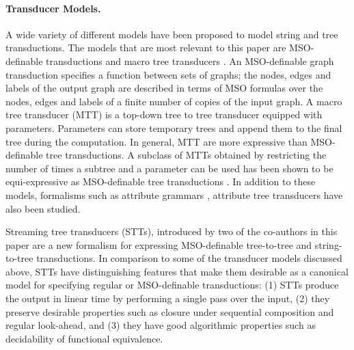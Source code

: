 \documentclass[11pt]{article}
\begin{document}
\paragraph{Transducer Models.}
A wide variety of different models have been proposed to model string
and tree transductions. The models that are most relevant to this
paper are MSO-definable transductions
\cite{courcelle_graph_2002,engelfriet_mso_2001} and macro tree
transducers \cite{engelfriet_macro_1985,engelfriet_macro2_1999}. An
MSO-definable graph transduction specifies a function between sets of
graphs; the nodes, edges and labels of the output graph are described
in terms of MSO formulas over the nodes, edges and labels of a finite
number of copies of the input graph.  A macro tree transducer (MTT) is
a top-down tree to tree transducer equipped with parameters.
Parameters can store temporary trees and append them to the final tree
during the computation. In general, MTT are more expressive than
MSO-definable tree transductions. A subclass of MTTs obtained by
restricting the number of times a subtree and a parameter can be used
has been shown to be equi-expressive as MSO-definable tree
transductions \cite{engelfriet_macro2_1999}. In addition to these
models, formalisms such as attribute grammars
\cite{engelfriet_macro2_1999}, attribute tree transducers
\cite{bloem_comparison_2000} have also been studied.

Streaming tree transducers \cite{alur_stt_2011} (STTs), introduced by
two of the co-authors in this paper are a new formalism for expressing
MSO-definable tree-to-tree and string-to-tree transductions. In
comparison to some of the transducer models discussed above, STTs have
distinguishing features that make them desirable as a canonical model
for specifying regular or MSO-definable transductions: (1) STTs
produce the output in linear time by performing a single pass over the
input, (2) they preserve desirable properties such as closure under
sequential composition and regular look-ahead, and (3) they have good
algorithmic properties such as decidability of functional equivalence.
\end{document}
